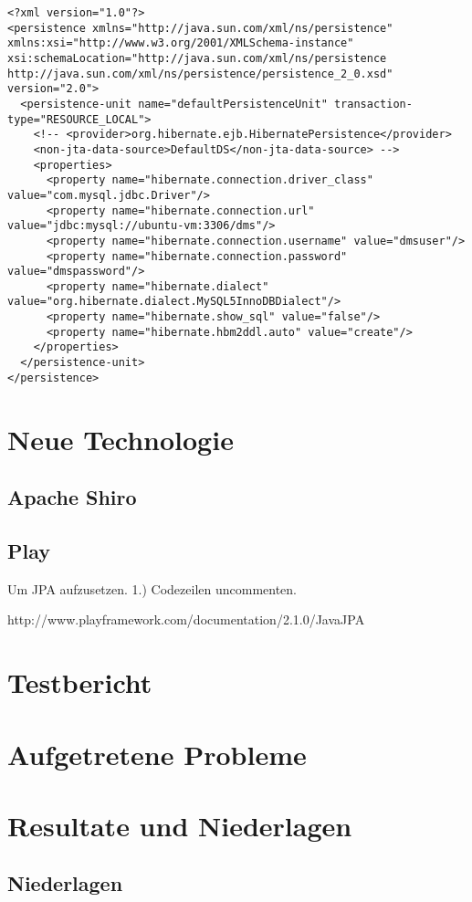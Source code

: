 \documentclass[11pt, a4paper]{article}
\begin{document}
\begin{lstlisting}
<?xml version="1.0"?>
<persistence xmlns="http://java.sun.com/xml/ns/persistence" xmlns:xsi="http://www.w3.org/2001/XMLSchema-instance" xsi:schemaLocation="http://java.sun.com/xml/ns/persistence http://java.sun.com/xml/ns/persistence/persistence_2_0.xsd" version="2.0">
  <persistence-unit name="defaultPersistenceUnit" transaction-type="RESOURCE_LOCAL">
    <!-- <provider>org.hibernate.ejb.HibernatePersistence</provider>
    <non-jta-data-source>DefaultDS</non-jta-data-source> -->
    <properties>
      <property name="hibernate.connection.driver_class" value="com.mysql.jdbc.Driver"/>
      <property name="hibernate.connection.url" value="jdbc:mysql://ubuntu-vm:3306/dms"/>
      <property name="hibernate.connection.username" value="dmsuser"/>
      <property name="hibernate.connection.password" value="dmspassword"/>
      <property name="hibernate.dialect" value="org.hibernate.dialect.MySQL5InnoDBDialect"/>
      <property name="hibernate.show_sql" value="false"/>
      <property name="hibernate.hbm2ddl.auto" value="create"/>
    </properties>
  </persistence-unit>
</persistence>
\end{lstlisting}

\section{Neue Technologie}

\subsection{Apache Shiro}

\subsection{Play}

Um JPA aufzusetzen.
1.) Codezeilen uncommenten.

http://www.playframework.com/documentation/2.1.0/JavaJPA

\section{Testbericht}
\section{Aufgetretene Probleme}
\section{Resultate und Niederlagen}
\subsection{Niederlagen}
{}

\end{document}
